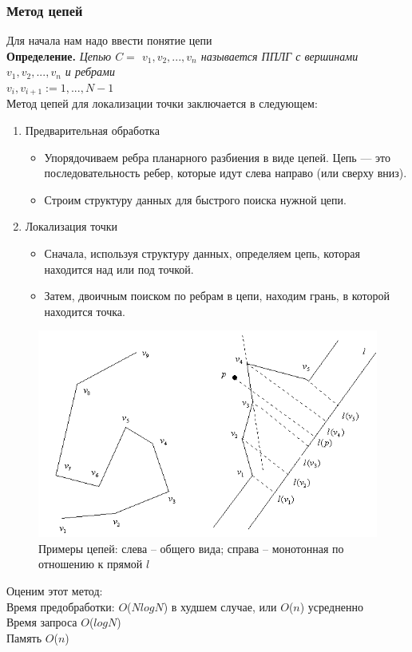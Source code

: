 \subsubsection*{Метод цепей}
\par Для начала нам надо ввести понятие цепи \\
\textbf{Определение.} \textit{Цепью $C = $ {$v_1, v_2,...,v_n$} называется ППЛГ с вершинами {$v_1, v_2,...,v_n$} и ребрами \\{${v_i,v_{i+1}:=1,...,N-1}$}} \\
Метод цепей для локализации точки заключается в следующем:
\begin{enumerate}
    \item Предварительная обработка
          \begin{itemize}
              \item Упорядочиваем ребра планарного разбиения в виде цепей. Цепь --- это последовательность ребер, которые идут слева направо (или сверху вниз).
              \item Строим структуру данных для быстрого поиска нужной цепи.
          \end{itemize}
    \item Локализация точки
          \begin{itemize}
              \item Сначала, используя структуру данных, определяем цепь, которая находится над или под точкой.
              \item Затем, двоичным поиском по ребрам в цепи, находим грань, в которой находится точка.
          \end{itemize}
\end{enumerate}

\begin{figure}[H]
    \centering
    \includegraphics[width=0.6\linewidth]{cep.png}
    \caption{Примеры цепей: слева – общего вида; справа – монотонная по отношению к прямой $l$}
\end{figure}
Оценим этот метод: \\
Время предобработки: $O$($NlogN$) в худшем случае,  или $O$($n$) усредненно \\
Время запроса    $O$($logN$) \\
Память        $O$($n$)

